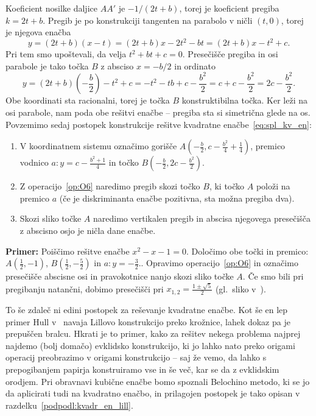 Koeficient nosilke daljice $AA'$ je $ - 1/(2t + b)$, torej je koeficient pregiba $k = 2t + b$. Pregib je po konstrukciji tangenten na parabolo v ničli $(t, 0)$, torej je njegova enačba
$$ y = (2t + b)(x - t) = (2t + b)x - 2t^2 - bt = (2t + b)x - t^2 + c. $$
Pri tem smo upoštevali, da velja $t^2 + bt + c = 0$. Presečišče pregiba in osi parabole je tako točka $B$ z absciso $ x = -b/2 $ in ordinato
$$ y = (2t + b)\left(-\frac{b}{2}\right) - t^2 + c = - t^2 - tb + c - \frac{b^2}{2} = c + c - \frac{b^2}{2} = 2c - \frac{b^2}{2}.$$
Obe koordinati sta racionalni, torej je točka $B$ konstruktibilna točka. Ker leži na osi parabole, nam poda obe rešitvi enačbe -- pregiba sta si simetrična glede na os. Povzemimo sedaj postopek konstrukcije rešitve kvadratne enačbe~\ref{eq:spl_kv_en}:
\begin{enumerate}
    \item V koordinatnem sistemu označimo gorišče $A\left(-\frac{b}{2}, c - \frac{b^2}{4} + \frac{1}{4}\right)$, premico vodnico $a: y = c - \frac{b^2 + 1}{4}$ in točko $B(-\frac{b}{2}, 2c - \frac{b^2}{2})$.
    \item Z operacijo~\ref{op:O6} naredimo pregib skozi točko $B$, ki točko $A$ položi na premico $a$ (če je diskriminanta enačbe pozitivna, sta možna pregiba dva).
    \item Skozi sliko točke $A$ naredimo vertikalen pregib in abscisa njegovega presečišča z abscisno osjo je ničla dane enačbe.
\end{enumerate}

\textbf{Primer:} Poiščimo rešitve enačbe $x^2 - x - 1 = 0$. Določimo obe točki in premico: $A(\frac{1}{2}, -1)$, $B(\frac{1}{2}, -\frac{5}{2})$ in $a: y = -\frac{3}{2}.$. Opravimo operacijo~\ref{op:O6} in označimo presečišče abscisne osi in pravokotnice nanjo skozi sliko točke $A$. Če smo bili pri pregibanju natančni, dobimo presečišči pri $x_{1,2} = \frac{1 \pm \sqrt{5}}{2}$ (gl.\ sliko v~\cite[str.\ 37]{hull2020}).

To še zdaleč ni edini postopek za reševanje kvadratne enačbe. Kot še en lep primer Hull v~\cite[str.\ 38]{hull2020} navaja Lillovo konstrukcijo preko krožnice, lahek dokaz pa je prepuščen bralcu. Hkrati je to primer, kako za rešitev nekega problema najprej najdemo (bolj domačo) evklidsko konstrukcijo, ki jo lahko nato preko origami operacij preobrazimo v origami konstrukcijo -- saj že vemo, da lahko s prepogibanjem papirja konstruiramo vse in še več, kar se da z evklidskim orodjem. Pri obravnavi kubične enačbe bomo spoznali Belochino metodo, ki se jo da aplicirati tudi na kvadratno enačbo, in prilagojen postopek je tako opisan v razdelku~\ref{podpodl:kvadr_en_lill}.

